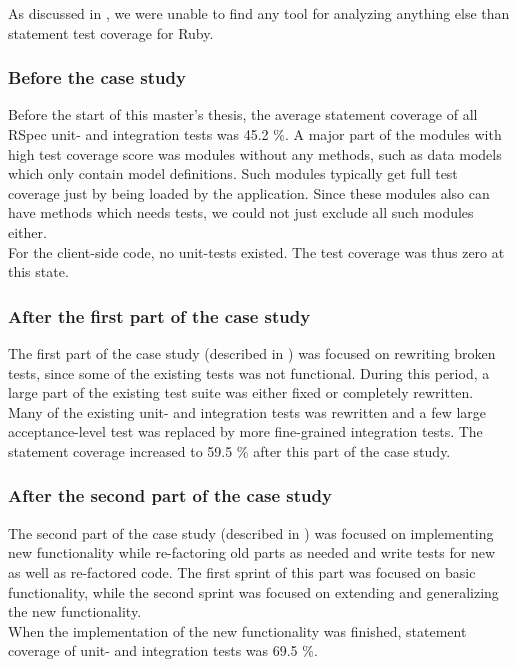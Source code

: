 
As discussed in , we were unable to find any tool
for analyzing anything else than statement test coverage for Ruby.\\

\subsubsection{Before the case study}

Before the start of this master's thesis, the average statement coverage
of all RSpec unit- and integration tests was 45.2 \%. A major part of
the modules with high test coverage score was modules without any
methods, such as data models which only contain model definitions. Such
modules typically get full test coverage just by being loaded by the
application. Since these modules also can have methods which needs
tests, we could not just exclude all such modules either.\\

For the client-side code, no unit-tests existed. The test coverage was
thus zero at this state.\\


\subsubsection{After the first part of the case study}

The first part of the case study (described in )
was focused on rewriting broken tests, since some of the existing tests
was not functional. During this period, a large part of the existing
test suite was either fixed or completely rewritten. Many of the
existing unit- and integration tests was rewritten and a few large
acceptance-level test was replaced by more fine-grained integration
tests. The statement coverage increased to 59.5 \% after this part of
the case study.


\subsubsection{After the second part of the case study}

The second part of the case study (described in )
was focused on implementing new functionality while re-factoring old
parts as needed and write tests for new as well as re-factored code. The
first sprint of this part was focused on basic functionality, while the
second sprint was focused on extending and generalizing the new
functionality.\\

When the implementation of the new functionality was finished, statement
coverage of unit- and integration tests was 69.5 \%.
